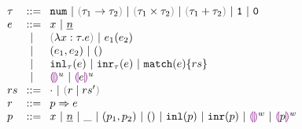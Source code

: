 \begin{figure}[t]
$\arraycolsep=4pt\begin{array}{lll}
\tau & ::= &
  \tnum ~\vert~
  \tarr{\tau_1}{\tau_2} ~\vert~
  \tprod{\tau_1}{\tau_2} ~\vert~
  \tsum{\tau_1}{\tau_2} ~\vert~
  \tunit ~\vert~
  \tvoid \\
e & ::= &
  x ~\vert~
  \hnum{n} \\
  & ~\vert~ &
  \hlam{x}{\tau}{e} ~\vert~
  \hap{e_1}{e_2} \\
  & ~\vert~ &
  \hpair{e_1}{e_2} ~\vert~
  \htriv \\
  & ~\vert~ &
  \hinl{\tau}{e} ~\vert~
  \hinr{\tau}{e} ~\vert~
  \hmatch{e}{rs} \\
  & ~\vert~ &
  \hehole{u} ~\vert~
  \hhole{e}{u} \\
rs & ::= &
  \cdot ~\vert~ \hrulesP{r}{rs'} \\
r & ::= &
  \hrul{p}{e} \\
p & ::= &
  x ~\vert~
  \hnum{n} ~\vert~
  \_ ~\vert~
  \hpair{p_1}{p_2} ~\vert~
  \htriv ~\vert~
  \hinlp{p} ~\vert~
  \hinrp{p} ~\vert~
  \hehole{w} ~\vert~
  \hhole{p}{w}
\end{array}$
\end{figure}

